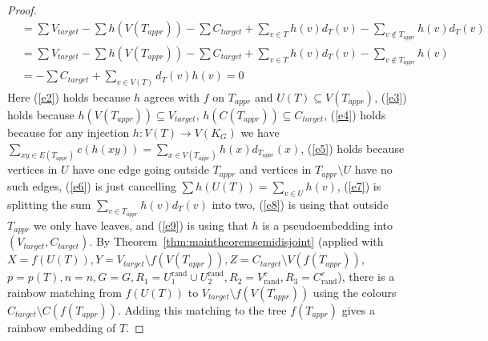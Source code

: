 \documentclass[a4paper,11pt,hidelinks]{amsart}
\theoremstyle{definition}
\begin{document}
\begin{proof}
\begin{align}
&=\sum  V_{target} -\sum h(V(T_{appr}))-\sum C_{target}+\sum_{v\in T} h(v)d_{T}(v)-\sum_{v\not\in T_{appr}} h(v)d_{T}(v)\label{e7}\\
&=\sum  V_{target} -\sum h(V(T_{appr}))-\sum C_{target}+\sum_{v\in T} h(v)d_{T}(v)-\sum_{v\not\in T_{appr}} h(v)\label{e8}\\
&=-\sum C_{target}+\sum_{v\in V(T)}d_T(v)h(v)
=0\label{e9}
\end{align}
Here (\ref{e2}) holds because $h$ agrees with $f$ on $T_{appr}$ and $U(T) \subseteq V(T_{appr})$, (\ref{e3}) holds because $h(V(T_{appr}))\subseteq V_{target}$, $h(C(T_{appr}))\subseteq C_{target}$, (\ref{e4}) holds because for any injection $h: V(T)\to V(K_G)$ we have $\sum_{xy\in E(T_{appr})} c(h(xy))=\sum_{x\in V(T_{appr})}h(x)d_{T_{appr}}(x)$, (\ref{e5}) holds because vertices in $U$ have one edge going outside $T_{appr}$ and vertices in $T_{appr}\setminus U$ have no such edges, (\ref{e6}) is just cancelling $\sum h(U(T))=\sum_{v\in U}h(v)$, (\ref{e7}) is splitting the sum $\sum_{v\in T_{appr}}h(v)d_T(v)$ into two, (\ref{e8}) is using that outside $T_{appr}$ we only have leaves, and (\ref{e9}) is using that $h$ is a pseudoembedding into $(V_{target}, C_{target})$.
By Theorem~\ref{thm:maintheoremsemidisjoint} (applied with $X=f(U(T)), Y=V_{target}\setminus f(V(T_{appr})), Z=C_{target}\setminus V(f(T_{appr}))$, $p=p(T), n=n, G=G,  R_1=U_1^{\mathrm{rand}}\cup U_2^{\mathrm{rand}}, R_2=V_{\mathrm{rand}}^c, R_3=C_{\mathrm{rand}}^c$), there is a rainbow matching from $f(U(T))$ to $V_{target}\setminus f(V(T_{appr}))$ using the colours $C_{target}\setminus C(f(T_{appr}))$. Adding this matching to the tree $f(T_{appr})$ gives a rainbow embedding of $T$.


\end{proof}
\end{document}
